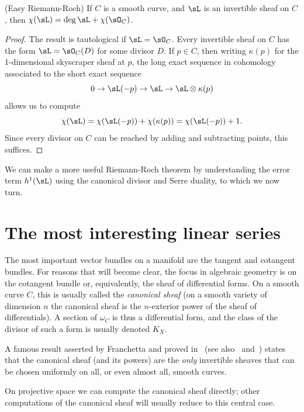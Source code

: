 \begin{theorem} (Easy Riemann-Roch)\label{easy RR}
If $C$ is a smooth curve, and $\sL$ is an invertible sheaf on $C$, then $\chi(\sL) = \deg \sL + \chi(\sO_C)$.
\end{theorem}

\begin{proof}
 The result is tautological if $\sL = \sO_C$. Every invertible sheaf on $C$ has the form $\sL = \sO_C(D)$ for some
divisor $D$. If $p\in C$, then writing $\kappa(p)$ for the 1-dimensional skyscraper sheaf at $p$, the long exact sequence in cohomology
associated to the short exact sequence
$$
0\to \sL(-p) \to \sL \to \sL\otimes \kappa(p)
$$
allows us to compute 
$$
\chi(\sL) = \chi(\sL(-p)) + \chi(\kappa(p)) = \chi(\sL(-p)) + 1.
$$
Since every divisor on $C$ can be reached by adding and subtracting points, this suffices.
\end{proof}

We can make a more useful Riemann-Roch theorem by understanding the error term $h^1(\sL)$ using
the canonical divisor and Serre duality, to which
we now turn.


\section{The most interesting linear series}

The most important vector bundles on a manifold are the tangent and cotangent bundles. For reasons that
will become clear, the focus in algebraic geometry is on the cotangent bundle or, equivalently, the sheaf of differential forms. On a smooth curve $C$, this is usually called the \emph{canonical sheaf} (on a smooth
variety of dimension $n$ the canonical sheaf is the $n$-exterior power of the sheaf of differentials). A section of 
$\omega_C$ is thus a differential form, and the class of the divisor
of such a form is usually denoted $K_X$. 

\begin{fact}
A famous result asserted by Franchetta and proved in~\cite{Harer} (see also~\cite{MR895568} and~\cite{MR1984659}) states that the canonical sheaf (and its powers) are the \emph{only} invertible sheaves that can be chosen uniformly on all, or even almost all, smooth curves. 
\end{fact}

On projective space we can compute the canonical sheaf directly; other computations of the canonical sheaf will usually reduce to this central case.

